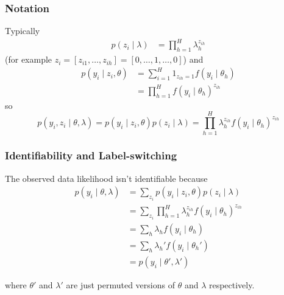 \documentclass{beamer}
\begin{document}
\begin{frame}
\frametitle{Notation}

Typically
\begin{align*}
p(z_i \mid \lambda) &= \prod_{h=1}^H \lambda_h^{z_{ih}} 
\end{align*}
(for example $z_i =  [z_{i1},  \ldots, z_{ih}]= [0, \ldots, 1, \ldots, 0]$) and
\begin{align*}
p(y_i \mid z_i, \theta) &= \sum_{i=1}^H 1_{z_{ih}=1} f(y_i \mid \theta_h) \\
&= \prod_{h=1}^H f(y_i \mid \theta_h)^{z_{ih} }
\end{align*}
so
$$
p(y_i , z_i \mid \theta, \lambda) = p(y_i \mid z_i, \theta) p(z_i \mid \lambda) = \prod_{h=1}^H \lambda_h^{z_{ih}} f(y_i \mid \theta_h)^{z_{ih} }
$$

\end{frame}
\begin{frame}
\frametitle{Identifiability and Label-switching}

The observed data likelihood isn't identifiable because
\begin{align*}
p(y_i \mid \theta, \lambda) &= \sum_{z_i} p(y_i \mid z_i, \theta) p(z_i \mid \lambda) \\
&= \sum_{z_i} \prod_{h=1}^H \lambda_h^{z_{ih}} f(y_i \mid \theta_h)^{z_{ih} } \\
&= \sum_{h} \lambda_h f(y_i \mid \theta_h) \\
&= \sum_{h} \lambda_h' f(y_i \mid \theta_h') \\
&= p(y_i \mid \theta', \lambda')
\end{align*}


where $\theta'$ and $\lambda'$ are just permuted versions of $\theta$ and $\lambda$ respectively.

\end{frame}
\end{document}

